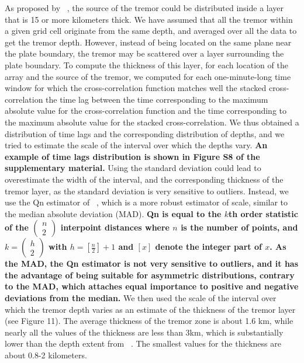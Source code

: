 \documentclass[draft]{agujournal2019}
\begin{document}
As proposed by ~, the source of the tremor could be distributed inside a layer that is 15 or more kilometers thick. We have assumed that all the tremor within a given grid cell originate from the same depth, and averaged over all the data to get the tremor depth. However, instead of being located on the same plane near the plate boundary, the tremor may be scattered over a layer surrounding the plate boundary. To compute the thickness of this layer, for each location of the array and the source of the tremor, we computed for each one-minute-long time window for which the cross-correlation function matches well the stacked cross-correlation the time lag between the time corresponding to the maximum absolute value for the cross-correlation function and the time corresponding to the maximum absolute value for the stacked cross-correlation. We thus obtained a distribution of time lags and the corresponding distribution of depths, and we tried to estimate the scale of the interval over which the depths vary. \textbf{An example of time lags distribution is shown in Figure S8 of the supplementary material.} Using the standard deviation could lead to overestimate the width of the interval, and the corresponding thickness of the tremor layer, as the standard deviation is very sensitive to outliers. Instead, we use the Qn estimator of ~, which is a more robust estimator of scale, similar to the median absolute deviation (MAD). \textbf{Qn is equal to the $k$th order statistic of the $\begin{pmatrix} n \\ 2 \end{pmatrix}$ interpoint distances where $n$ is the number of points, and $k = \begin{pmatrix} h \\ 2 \end{pmatrix}$ with $h = \left[ \frac{n}{2} \right] + 1$ and $\left[ x \right]$ denote the integer part of $x$. As the MAD, the Qn estimator is not very sensitive to outliers, and it has the advantage of being suitable for asymmetric distributions, contrary to the MAD, which attaches equal importance to positive and negative deviations from the median.} We then used the scale of the interval over which the tremor depth varies as an estimate of the thickness of the tremor layer (see Figure 11). The average thickness of the tremor zone is about 1.6 km, while nearly all the values of the thickness are less than 3km, which is substantially lower than the depth extent from ~. The smallest values for the thickness are about 0.8-2 kilometers. \\
\end{document}
